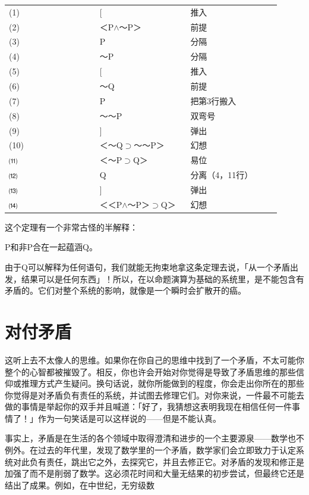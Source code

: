 \documentclass[
  12pt,
  twoside,
  openright,
  oldfontcommands,
]{memoir}
\begin{document}
\begin{longtable}[]{>{\raggedright\arraybackslash}p{0.313\linewidth} >{\raggedright\arraybackslash}p{0.313\linewidth} >{\raggedright\arraybackslash}p{0.313\linewidth}}
\toprule\noalign{}
\endhead
\bottomrule\noalign{}
\endlastfoot
(1) & {[} & 推入 \\
(2) & ＜P$\wedge$～P＞ & 前提 \\
(3) & P & 分隔 \\
(4) & ～P & 分隔 \\
(5) & {[} & 推入 \\
(6) & ～Q & 前提 \\
(7) & P & 把第3行搬入 \\
(8) & ～～P & 双弯号 \\
(9) & {]} & 弹出 \\
(10) & ＜～Q$\supset$～～P＞ & 幻想 \\
⑾ & ＜～P$\supset$Q＞ & 易位 \\
⑿ & Q & 分离（4，11行） \\
⒀ & {]} & 弹出 \\
⒁ & ＜＜P$\wedge$～P＞$\supset$Q＞ & 幻想 \\
\end{longtable}

这个定理有一个非常古怪的半解释：

P和非P合在一起蕴涵Q。

由于Q可以解释为任何语句，我们就能无拘束地拿这条定理去说，「从一个矛盾出发，结果可以是任何东西」！所以，在以命题演算为基础的系统里，是不能包含有矛盾的。它们对整个系统的影响，就像是一个瞬时会扩散开的癌。

\section{对付矛盾}

这听上去不太像人的思维。如果你在你自己的思维中找到了一个矛盾，不太可能你整个的心智都被摧毁了。相反，你也许会开始对你觉得是导致了矛盾思维的那些信仰或推理方式产生疑问。换句话说，就你所能做到的程度，你会走出你所在的那些你觉得是对矛盾负有责任的系统，并试图去修理它们。对你来说，一件最不可能去做的事情是举起你的双手并且喊道：「好了，我猜想这表明我现在相信任何一件事情了！」作为一句笑话是可以这样说的------但是不能认真。

事实上，矛盾是在生活的各个领域中取得澄清和进步的一个主要源泉------数学也不例外。在过去的年代里，发现了数学里的一个矛盾，数学家们会立即致力于认定系统对此负有责任，跳出它之外，去探究它，并且去修正它。对矛盾的发现和修正是加强了而不是削弱了数学。这必须花时间和大量无结果的初步尝试，但最终它还是结出了成果。例如，在中世纪，无穷级数
\end{document}
